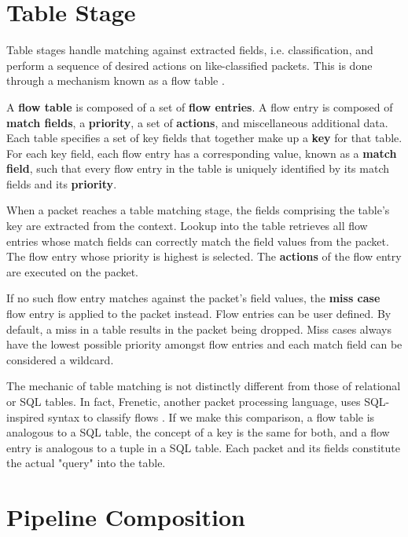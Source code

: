 \section{Table Stage} \label{table_desc}

Table stages handle matching against extracted fields, i.e. classification, and perform a sequence of desired actions on like-classified packets. This is done through a mechanism known as a flow table \cite{openflow_spec}.

A \textbf{flow table} is composed of a set of \textbf{flow entries}. A flow entry is composed of \textbf{match fields}, a \textbf{priority}, a set of \textbf{actions}, and miscellaneous additional data. Each table specifies a set of key fields that together make up a \textbf{key} for that table. For each key field, each flow entry has a corresponding value, known as a \textbf{match field}, such that every flow entry in the table is uniquely identified by its match fields and its \textbf{priority}.

When a packet reaches a table matching stage, the fields comprising the table's key are extracted from the context. Lookup into the table retrieves all flow entries whose match fields can correctly match the field values from the packet. The flow entry whose priority is highest is selected. The \textbf{actions} of the flow entry are executed on the packet.

If no such flow entry matches against the packet's field values, the \textbf{miss case} flow entry is applied to the packet instead. Flow entries can be user defined. By default, a miss in a table results in the packet being dropped. Miss cases always have the lowest possible priority amongst flow entries and each match field can be considered a wildcard.

The mechanic of table matching is not distinctly different from those of relational or SQL tables. In fact, Frenetic, another packet processing language, uses SQL-inspired syntax to classify flows \cite{frenetic_paper1}. If we make this comparison, a flow table is analogous to a SQL table, the concept of a key is the same for both, and a flow entry is analogous to a tuple in a SQL table. Each packet and its fields constitute the actual "query" into the table.

\section{Pipeline Composition} \label{pipeline_comp_desc}

